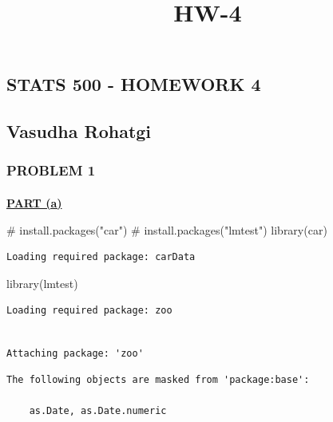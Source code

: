 \documentclass[
  11pt,
]{article}
\title{HW-4}
\author{}
\date{}
\makeatletter
\let\oldparagraph\paragraph
\renewcommand{\paragraph}{
    \@ifstar
      \xxxParagraphStar
      \xxxParagraphNoStar
  }
\newcommand{\xxxParagraphStar}[1]{\oldparagraph*{#1}\mbox{}}
\newcommand{\xxxParagraphNoStar}[1]{\oldparagraph{#1}\mbox{}}
\newenvironment{Shaded}{\begin{snugshade}}{\end{snugshade}}
\newcommand{\CommentTok}[1]{\textcolor[rgb]{0.37,0.37,0.37}{#1}}
\newcommand{\FunctionTok}[1]{\textcolor[rgb]{0.28,0.35,0.67}{#1}}
\newcommand{\NormalTok}[1]{\textcolor[rgb]{0.00,0.23,0.31}{#1}}
\makeatother
\begin{document}
\maketitle


\subsection{STATS 500 - HOMEWORK 4}\label{stats-500---homework-4}

\subsection{Vasudha Rohatgi}\label{vasudha-rohatgi}

\subsubsection{PROBLEM 1}\label{problem-1}

\paragraph{\texorpdfstring{\ul{\textbf{PART
(a)}}}{PART (a)}}\label{part-a}

\begin{Shaded}
\begin{Highlighting}[]
\CommentTok{\# install.packages("car")}
\CommentTok{\# install.packages("lmtest")}
\FunctionTok{library}\NormalTok{(car)}
\end{Highlighting}
\end{Shaded}

\begin{verbatim}
Loading required package: carData
\end{verbatim}

\begin{Shaded}
\begin{Highlighting}[]
\FunctionTok{library}\NormalTok{(lmtest)}
\end{Highlighting}
\end{Shaded}

\begin{verbatim}
Loading required package: zoo
\end{verbatim}

\begin{verbatim}

Attaching package: 'zoo'
\end{verbatim}

\begin{verbatim}
The following objects are masked from 'package:base':

    as.Date, as.Date.numeric
\end{verbatim}
\end{document}
